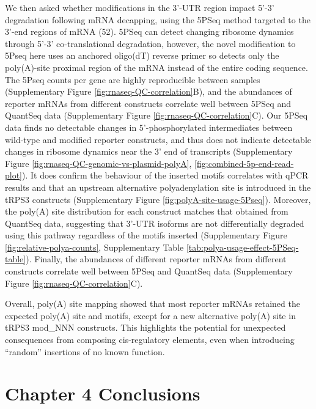 \documentclass{SBCbookchapter}
\begin{document}
We then asked whether modifications in the 3'-UTR region impact 5'-3' degradation following mRNA decapping, using the 5PSeq method targeted to the 3'-end regions of mRNA (52).
5PSeq can detect changing ribosome dynamics through 5'-3' co-translational degradation, however, the novel modification to 5Pseq here uses an anchored oligo(dT) reverse primer so detects only the poly(A)-site proximal region of the mRNA instead of the entire coding sequence.
The 5Pseq counts per gene are highly reproducible between samples (Supplementary Figure \ref{fig:rnaseq-QC-correlation}B), and the abundances of reporter mRNAs from different constructs correlate well between 5PSeq and QuantSeq data (Supplementary Figure \ref{fig:rnaseq-QC-correlation}C).
Our 5PSeq data finds no detectable changes in 5'-phosphorylated intermediates between wild-type and modified reporter constructs, and thus does not indicate detectable changes in ribosome dynamics near the 3' end of transcripts (Supplementary Figure \ref{fig:rnaseq-QC-genomic-vs-plasmid-polyA}, \ref{fig:combined-5p-end-read-plot}).
It does confirm the behaviour of the inserted motifs correlates with qPCR results and that an upstream alternative polyadenylation site is introduced in the tRPS3 constructs (Supplementary Figure \ref{fig:polyA-site-usage-5Pseq}).
Moreover, the poly(A) site distribution for each construct matches that obtained from QuantSeq data, suggesting that 3'-UTR isoforms are not differentially degraded using this pathway regardless of the motifs inserted (Supplementary Figure \ref{fig:relative-polya-counts}, Supplementary Table \ref{tab:polya-usage-effect-5PSeq-table}).
Finally, the abundances of different reporter mRNAs from different constructs correlate well between
5PSeq and QuantSeq data (Supplementary Figure \ref{fig:rnaseq-QC-correlation}C).

Overall, poly(A) site mapping showed that most reporter mRNAs retained the expected poly(A) site and motifs, except for a new alternative poly(A) site in tRPS3 mod\_NNN constructs.
This highlights the potential for unexpected consequences from composing cis-regulatory elements, even when introducing ``random'' insertions of no known function.


\section{Chapter 4 Conclusions}
\end{document}
